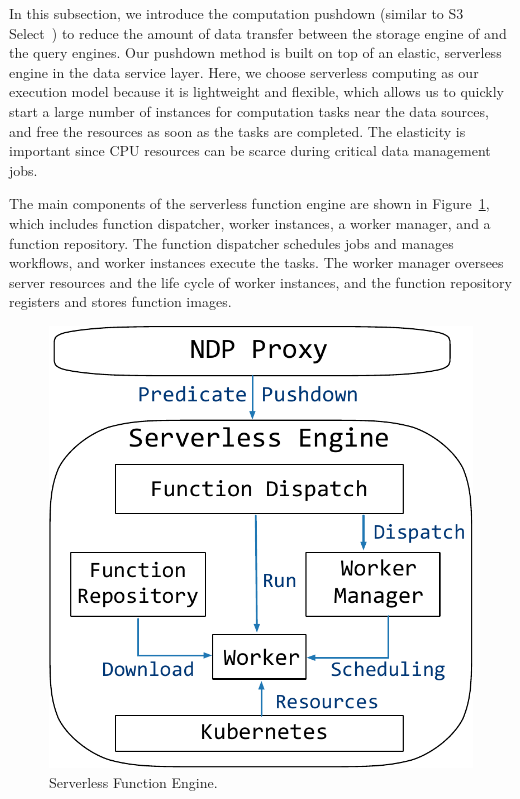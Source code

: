 In this subsection, we introduce the computation pushdown (similar to S3 Select~\cite{s3}) to reduce the amount of data transfer between the  storage engine of \sys and the query engines.  Our pushdown method is built on top of an elastic, serverless engine in the data service layer. Here, we choose serverless computing as our execution model because it is lightweight  and flexible, which allows us to quickly start a large number of instances for computation tasks near the data sources, and free the resources as soon as the tasks are completed. The elasticity is important since CPU resources can be scarce during critical data management jobs.

The main components of the serverless function engine are shown in Figure~\ref{fig:serverless}, which includes function dispatcher, worker instances, a worker manager, and a function repository. The function dispatcher schedules jobs and manages workflows, and worker instances execute the tasks. The worker manager oversees server resources and the life cycle of worker instances, and the function repository registers and stores function images.



\begin{figure}[htbp]
	\includegraphics[scale=0.3]{figures/serverless}
	\centering
	\vspace{-1em}
	\caption{Serverless Function Engine.}
	\label{fig:serverless}
	\vspace{-1em}
\end{figure}

